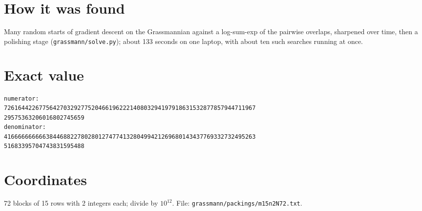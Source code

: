 \documentclass[11pt,a4paper]{article}
\begin{document}
\section{How it was found}
Many random starts of gradient descent on the Grassmannian against a log-sum-exp of the pairwise overlaps, sharpened over time, then a polishing stage (\texttt{grassmann/solve.py}); about 133 seconds on one laptop, with about ten such searches running at once.


\appendix
\section{Exact value}
{\small
\begin{verbatim}
numerator:
726164422677564270329277520466196222140803294197918631532877857944711967
29575363206016802745659
denominator:
416666666666384468822780280127477413280499421269680143437769332732495263
51683395704743831595488
\end{verbatim}}

\section{Coordinates}
72 blocks of 15 rows with 2 integers each; divide by $10^{12}$. File: \texttt{grassmann/packings/m15n2N72.txt}.
{\tiny
\begin{multicols}{4}
\end{multicols}}
\end{document}
